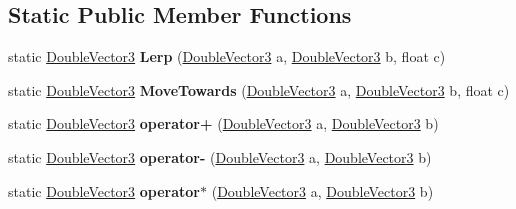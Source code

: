 \subsection*{Static Public Member Functions}
\begin{DoxyCompactItemize}
\item 
\mbox{\label{struct_q9_core_1_1_double_vector3_a2f3309c3f2d9d024b30718569e55a4f0}} 
static \mbox{\hyperlink{struct_q9_core_1_1_double_vector3}{Double\+Vector3}} {\bfseries Lerp} (\mbox{\hyperlink{struct_q9_core_1_1_double_vector3}{Double\+Vector3}} a, \mbox{\hyperlink{struct_q9_core_1_1_double_vector3}{Double\+Vector3}} b, float c)
\item 
\mbox{\label{struct_q9_core_1_1_double_vector3_a5dc3e254bc4864a08804b896ddbe38a6}} 
static \mbox{\hyperlink{struct_q9_core_1_1_double_vector3}{Double\+Vector3}} {\bfseries Move\+Towards} (\mbox{\hyperlink{struct_q9_core_1_1_double_vector3}{Double\+Vector3}} a, \mbox{\hyperlink{struct_q9_core_1_1_double_vector3}{Double\+Vector3}} b, float c)
\item 
\mbox{\label{struct_q9_core_1_1_double_vector3_abeaaa0c6a6c81ce3c927b81a58432c08}} 
static \mbox{\hyperlink{struct_q9_core_1_1_double_vector3}{Double\+Vector3}} {\bfseries operator+} (\mbox{\hyperlink{struct_q9_core_1_1_double_vector3}{Double\+Vector3}} a, \mbox{\hyperlink{struct_q9_core_1_1_double_vector3}{Double\+Vector3}} b)
\item 
\mbox{\label{struct_q9_core_1_1_double_vector3_acc43be2ad90ed9527bd25a312c3f709b}} 
static \mbox{\hyperlink{struct_q9_core_1_1_double_vector3}{Double\+Vector3}} {\bfseries operator-\/} (\mbox{\hyperlink{struct_q9_core_1_1_double_vector3}{Double\+Vector3}} a, \mbox{\hyperlink{struct_q9_core_1_1_double_vector3}{Double\+Vector3}} b)
\item 
\mbox{\label{struct_q9_core_1_1_double_vector3_afd77fcde3f1313f100b1fe3d0a08a0a1}} 
static \mbox{\hyperlink{struct_q9_core_1_1_double_vector3}{Double\+Vector3}} {\bfseries operator$\ast$} (\mbox{\hyperlink{struct_q9_core_1_1_double_vector3}{Double\+Vector3}} a, \mbox{\hyperlink{struct_q9_core_1_1_double_vector3}{Double\+Vector3}} b)
\item 

\end{DoxyCompactItemize}
